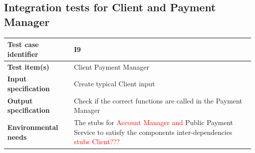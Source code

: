 \documentclass[a4paper,11pt]{report} %
\begin{document}
		\subsection{Integration tests for Client and Payment Manager}
			\begin{minipage}{\linewidth}
			\end{minipage}
		\begin{center}
			\renewcommand{\arraystretch}{1.2}
			\setlength{\tabcolsep}{24pt}
			\begin{tabular}{ l  p{9cm}}\hline
				\textbf{Test case identifier} & I9\\\hline
				\textbf{Test item(s)} & Client \textrightarrow Payment Manager\\\hline
				\textbf{Input specification} & Create typical Client input \\\hline
				\textbf{Output specification} & Check if the correct functions are called in the Payment Manager\\\hline
				\textbf{Environmental needs} &  The stubs for \textcolor{red}{Account Manager and }Public Payment Service to satisfy the components inter-dependencies \textcolor{red}{stubs Client???}\\\hline
			\end{tabular}
		\end{center}
		
\end{document}

